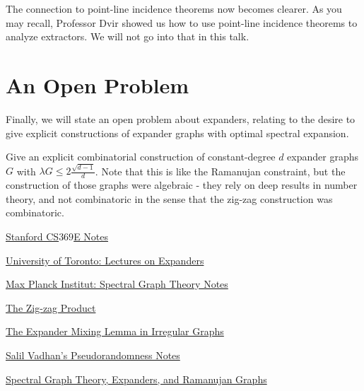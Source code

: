 \documentclass[11pt]{article}
\theoremstyle{definition}
\theoremstyle{definition}
\theoremstyle{definition}
\begin{document}
The connection to point-line incidence theorems now becomes clearer. As you may recall, Professor Dvir showed us how to use point-line incidence theorems to analyze extractors. We will not go into that in this talk. 


\section{An Open Problem}

Finally, we will state an open problem about expanders, relating to the desire to give explicit constructions of expander graphs with optimal spectral expansion. 

Give an explicit combinatorial construction of constant-degree $d$ expander graphs $G$ with 
$\lambda{G} \leq 2\frac{\sqrt{d - 1}}{d}$. Note that this is like the Ramanujan constraint, but the construction of those graphs were algebraic - they rely on deep results in number theory, and not combinatoric in the sense that the zig-zag construction was combinatoric.

\newpage
\begin{thebibliography}{99} %

\href{http://www.tcs.tifr.res.in/~prahladh/teaching/05spring/lectures/lec2.pdf}{Stanford CS$369$E Notes}

\href{http://www.math.toronto.edu/~michal/skrypt-stg.pdf}{University of Toronto: Lectures on Expanders}

\href{http://resources.mpi-inf.mpg.de/departments/d1/teaching/ws11/SGT/Lecture3.pdf}{Max Planck Institut: Spectral Graph Theory Notes}

\href{https://lucatrevisan.wordpress.com/2011/03/07/cs359g-lecture-17-the-zig-zag-product/}{The Zig-zag Product}

\href{https://lucatrevisan.wordpress.com/2014/08/26/the-expander-mixing-lemma-in-irregular-graphs/}{The Expander Mixing Lemma in Irregular Graphs}

\href{http://people.seas.harvard.edu/~salil/pseudorandomness/expanders.pdf}{Salil Vadhan's Pseudorandomness Notes}

\href{http://www.math.washington.edu/~morrow/papers/chris-thesis.pdf}{Spectral Graph Theory, Expanders, and Ramanujan Graphs}

\end{thebibliography}










\end{document}
